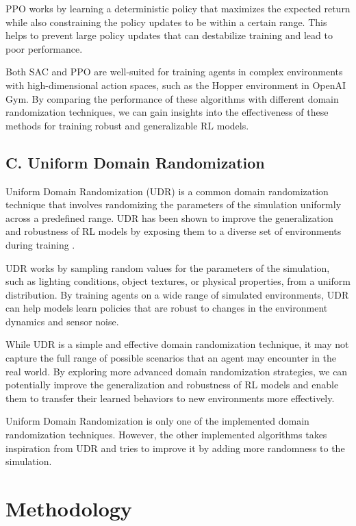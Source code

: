 \documentclass[12pt]{article}
\begin{document}
PPO works by learning a deterministic policy that maximizes the expected return while also constraining the policy updates to be within a certain range. This helps to prevent large policy updates that can destabilize training and lead to poor performance.

Both SAC and PPO are well-suited for training agents in complex environments with high-dimensional action spaces, such as the Hopper environment in OpenAI Gym. By comparing the performance of these algorithms with different domain randomization techniques, we can gain insights into the effectiveness of these methods for training robust and generalizable RL models.

\subsection{C. Uniform Domain Randomization}

Uniform Domain Randomization (UDR) is a common domain randomization technique that involves randomizing the parameters of the simulation uniformly across a predefined range. UDR has been shown to improve the generalization and robustness of RL models by exposing them to a diverse set of environments during training \cite{Tobin2017}.

UDR works by sampling random values for the parameters of the simulation, such as lighting conditions, object textures, or physical properties, from a uniform distribution. By training agents on a wide range of simulated environments, UDR can help models learn policies that are robust to changes in the environment dynamics and sensor noise.

While UDR is a simple and effective domain randomization technique, it may not capture the full range of possible scenarios that an agent may encounter in the real world. By exploring more advanced domain randomization strategies, we can potentially improve the generalization and robustness of RL models and enable them to transfer their learned behaviors to new environments more effectively. 

Uniform Domain Randomization is only one of the implemented domain randomization techniques. However, the other implemented algorithms takes inspiration from UDR and tries to improve it by adding more randomness to the simulation.

\section{Methodology}
\end{document}
